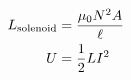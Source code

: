 

\vspace*{\fill}
\centering

\begin{align*}
    L_{\rm solenoid} &= \frac{\mu_0 N^2 A}{\ell} \\
    U &= \frac{1}{2} L I^2
\end{align*}

\centering
\vspace*{\fill}


